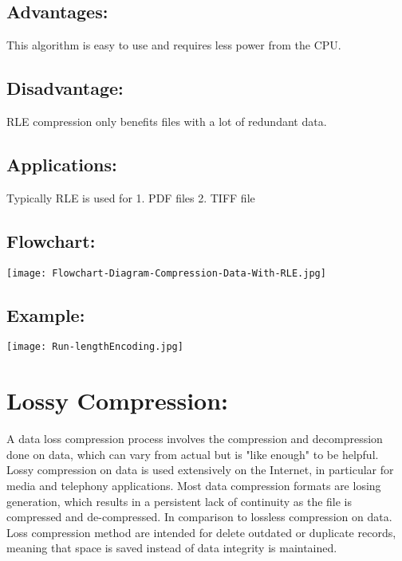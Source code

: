 \documentclass[a4paper, 12pt]{article}
\begin{document}
\subsection{Advantages:}
\par This algorithm is easy to use and requires less power from the CPU.
\\

\subsection{Disadvantage:}
\par  RLE compression only benefits files with a lot of redundant data.
\\

\subsection{ Applications:}
\par Typically RLE is used for
1. PDF files
2. TIFF file
\\

\newpage

\subsection{Flowchart:}
\texttt{[image: Flowchart-Diagram-Compression-Data-With-RLE.jpg]}
\vspace{5mm}

\newpage

\subsection{Example:}
\texttt{[image: Run-lengthEncoding.jpg]}
\vspace{5mm}

\newpage
\section{Lossy Compression:}
\par A data loss compression process involves the compression and 
decompression done on data, which can vary from actual but is "like 
enough" to be helpful. Lossy compression on data is used extensively on the 
Internet, in particular for media and telephony applications. Most data 
compression formats are losing generation, which results in a persistent lack 
of continuity as the file is compressed and de-compressed. In comparison to 
lossless compression on data. Loss compression method are intended for
delete outdated or duplicate records, meaning that space is saved instead of 
data integrity is maintained.
\\
\end{document}
